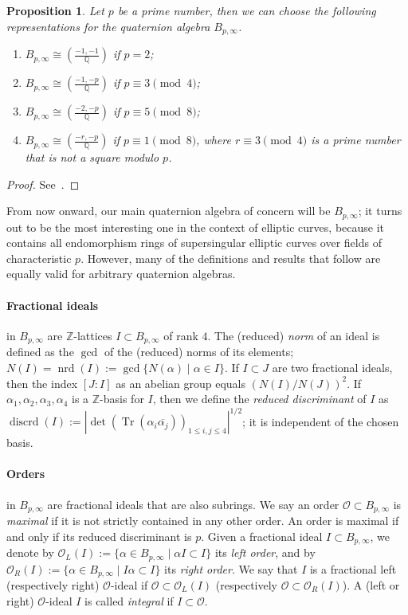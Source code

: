 \documentclass[10pt]{article}
\theoremstyle{plain}
\newtheorem{proposition}[theorem]{Proposition}
\theoremstyle{definition}
\DeclareMathOperator{\Tr}{Tr} %
\DeclareMathOperator{\nrd}{nrd} %
\DeclareMathOperator{\discrd}{discrd} %
\def\Q{\ensuremath{\mathbb{Q}}}
\def\Z{\ensuremath{\mathbb{Z}}}
\def\O{\ensuremath{\mathcal{O}}}
\begin{document}
\begin{proposition}
  \label{th:quat-presentation}
  Let $p$ be a prime number, then we can choose the following representations
  for the quaternion algebra $B_{p,\infty}$.
  \begin{enumerate}
  \item $B_{p,\infty} \cong \left(\frac{-1,-1}{\Q}\right)$
    if $p=2$;
  \item $B_{p,\infty} \cong \left(\frac{-1,-p}{\Q}\right)$
    if $p\equiv 3\pmod{4}$;
  \item $B_{p,\infty} \cong \left(\frac{-2,-p}{\Q}\right)$
    if $p\equiv 5\pmod{8}$;
  \item $B_{p,\infty} \cong \left(\frac{-r,-p}{\Q}\right)$
    if $p\equiv 1\pmod{8}$, where $r\equiv 3\pmod{4}$ is a prime number
    that is not a square modulo $p$.
  \end{enumerate}
\end{proposition}
\begin{proof}
  See~\cite{pizer1980}.
\end{proof}

From now onward, our main quaternion algebra of concern will be $B_{p,\infty}$;
it turns out to be the most interesting one in the context of elliptic curves,
because it contains all endomorphism rings of supersingular elliptic curves
over fields of characteristic $p$. However, many of the definitions and results
that follow are equally valid for arbitrary quaternion algebras.


\paragraph{Fractional ideals} in $B_{p,\infty}$ are $\Z$-lattices
$I\subset B_{p,\infty}$ of rank $4$.
The (reduced) \emph{norm} of an ideal is defined as the
$\gcd$ of the (reduced) norms of its elements;
$N(I) = \nrd(I) := \gcd\{N(\alpha)\mid\alpha\in I\}$.
If $I\subset J$ are two fractional ideals, then the index $[J:I]$ as
an abelian group equals $\left(N(I)/N(J)\right)^2$.
If $\alpha_1,\alpha_2,\alpha_3,\alpha_4$ is a $\Z$-basis for $I$, then
we define the \emph{reduced discriminant} of $I$ as $\discrd(I) :=
|\det(\Tr(\alpha_i\overline{\alpha_j}))_{1\leq i,j\leq 4}|^{1/2}$;
it is independent of the chosen basis.

\paragraph{Orders} in $B_{p,\infty}$ are fractional ideals that are also
subrings. We say an order $\O\subset B_{p,\infty}$ is \emph{maximal} if
it is not strictly contained in any other order. An order is maximal
if and only if its reduced discriminant is $p$.
Given a fractional ideal $I\subset B_{p,\infty}$,
we denote by $\O_L(I):=\{\alpha\in B_{p,\infty}\mid \alpha I\subset I\}$
its \emph{left order},
and by $\O_R(I):=\{\alpha\in B_{p,\infty}\mid I\alpha\subset I\}$
its \emph{right order}.
We say that $I$ is a fractional left (respectively right) $\O$-ideal if
$\O\subset\O_L(I)$ (respectively $\O\subset\O_R(I)$).
A (left or right) $\O$-ideal $I$ is called \emph{integral} if $I\subset\O$.
\end{document}
